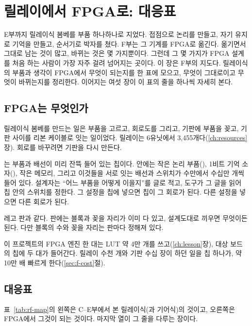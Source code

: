 \chapter{릴레이에서 FPGA로: 대응표}\label{ch:relay-to-fpga}

E부까지 릴레이식 봄베를 부품 하나하나로 지었다. 접점으로 논리를 만들고, 자기 유지로 기억을 만들고, 순서기로
박자를 쳤다. F부는 그 기계를 FPGA로 옮긴다. 옮기면서 그대로 남는 것이 많고, 바뀌는 것은 몇 가지뿐이다. 그런데
그 몇 가지가 FPGA 설계를 처음 하는 사람이 가장 자주 걸려 넘어지는 곳이다. 이 장은 F부의 지도다. 릴레이식의 부품과
생각이 FPGA에서 무엇이 되는지를 한 표에 모으고, 무엇이 그대로이고 무엇이 바뀌는지를 정리한다. 이어지는 여섯 장이
이 표의 줄을 하나씩 자세히 본다.

\section{FPGA는 무엇인가}\label{sec:rf-what}

\Relay 릴레이식 봄베를 만드는 일은 부품을 고르고, 회로도를 그리고, 기판에 부품을 꽂고, 기판 사이를 리본 케이블로
잇는 일이었다. 릴레이는 6유닛에서 3,455개다(\ref{ch:resources}장). 회로를 바꾸려면 기판을
다시 만든다.

\Why {}는 부품과 배선이 미리 잔뜩 들어 있는 칩이다. 안에는 작은 논리
부품(), 1비트 기억 소자(), 작은 메모리, 그리고 이것들을 서로 잇는
배선과 스위치가 수만에서 수십만 개씩 들어 있다. 설계자는 ``어느 부품을 어떻게 이을지''를 글로 적고, 도구가 그 글을
읽어 칩 안의 스위치를 정한다. 그 설정을 칩에 넣으면 칩이 그 회로가 된다. 다른 설정을 넣으면 다른 회로가 된다.

\General 레고 판과 같다. 판에는 블록과 꽂을 자리가 이미 다 있고, 설계도대로 끼우면 무엇이든 된다. 다만 블록의
수와 꽂을 자리는 판마다 정해져 있다.

\Ours 이 프로젝트의 FPGA 엔진 한 대는 LUT 약 4만 개를 쓰고(\ref{ch:lesson}장), 대상 보드의 칩에 두 대가 들어간다.
릴레이 수천 개와 기판 수십 장이 하던 일을 칩 하나가, 약 10만 배 빠르게 한다(\ref{sec:f-cost}절).

\section{대응표}\label{sec:rf-table}

표~\ref{tab:rf-map}의 왼쪽은 C--E부에서 본 릴레이식(과 기어식)의 것이고, 오른쪽은 FPGA에서 그것이 되는 것이다.
마지막 열이 그 줄을 다루는 장이다.

